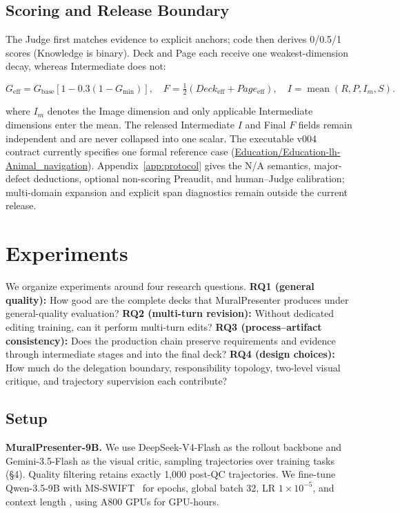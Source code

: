 \subsection{Scoring and Release Boundary}

The Judge first matches evidence to explicit anchors; code then derives 0/0.5/1 scores (Knowledge is binary). Deck and Page each receive one weakest-dimension decay, whereas Intermediate does not:

\[
G_{\mathrm{eff}}=G_{\mathrm{base}}[1-0.3(1-G_{\min})],\quad
F=\tfrac12(Deck_{\mathrm{eff}}+Page_{\mathrm{eff}}),\quad
I=\operatorname{mean}(R,P,I_m,S).
\]

where \(I_m\) denotes the Image dimension and only applicable Intermediate dimensions enter the mean. The released Intermediate \(I\) and Final \(F\) fields remain independent and are never collapsed into one scalar. The executable v004 contract currently specifies one formal reference case (\url{Education/Education-lh-Animal_navigation}). Appendix~\ref{app:protocol} gives the N/A semantics, major-defect deductions, optional non-scoring Preaudit, and human–Judge calibration; multi-domain expansion and explicit span diagnostics remain outside the current release.

\section{Experiments}

We organize experiments around four research questions. \textbf{RQ1 (general quality):} How good are the complete decks that MuralPresenter produces under general-quality evaluation? \textbf{RQ2 (multi-turn revision):} Without dedicated editing training, can it perform multi-turn edits? \textbf{RQ3 (process–artifact consistency):} Does the production chain preserve requirements and evidence through intermediate stages and into the final deck? \textbf{RQ4 (design choices):} How much do the delegation boundary, responsibility topology, two-level visual critique, and trajectory supervision each contribute?

\subsection{Setup}

\textbf{MuralPresenter-9B.} We use DeepSeek-V4-Flash as the rollout backbone and Gemini-3.5-Flash as the visual critic, sampling trajectories over  training tasks (§4). Quality filtering retains exactly 1,000 post-QC trajectories. We fine-tune Qwen-3.5-9B with MS-SWIFT~\citep{zhao2024mswift} for  epochs, global batch 32, LR \(1\times10^{-5}\), and context length , using  A800 GPUs for  GPU-hours.

